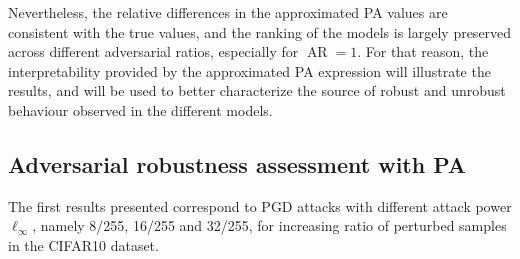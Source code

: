 Nevertheless, the relative differences in the approximated PA values are consistent
with the true values, and the ranking of the models is largely preserved across different
adversarial ratios, especially for $\operatorname{AR} = 1$. For that reason, the
interpretability provided by the approximated PA expression will illustrate
the results, and will be used to better characterize the source of robust and unrobust behaviour
observed in the different models. \\


\subsection{Adversarial robustness assessment with PA}

The first results presented correspond to PGD attacks with different attack power 
$\ell_\infty$, namely 8/255, 16/255 and 32/255, for increasing ratio of 
perturbed samples in the CIFAR10 dataset.


